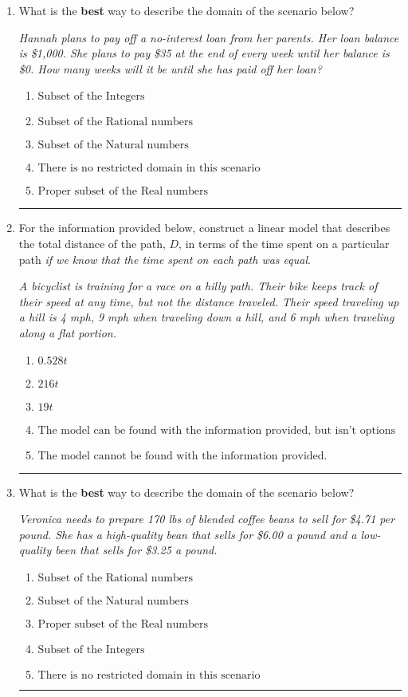\documentclass[14pt]{extbook}
\newcommand{\litem}[1]{\item#1\hspace*{-1cm}\rule{\textwidth}{0.4pt}}
\begin{document}
\begin{enumerate}
{\begin{enumerate}[label=\Alph*.]
\end{enumerate} }
\litem{
What is the \textbf{best} way to describe the domain of the scenario below?
\begin{center}
    \textit{ Hannah plans to pay off a no-interest loan from her parents. Her loan balance is \$1,000. She plans to pay \$35 at the end of every week until her balance is \$0. How many weeks will it be until she has paid off her loan? }
\end{center}
\begin{enumerate}[label=\Alph*.]
\item \( \text{Subset of the Integers} \)
\item \( \text{Subset of the Rational numbers} \)
\item \( \text{Subset of the Natural numbers} \)
\item \( \text{There is no restricted domain in this scenario} \)
\item \( \text{Proper subset of the Real numbers} \)

\end{enumerate} }
\litem{
For the information provided below, construct a linear model that describes the total distance of the path, $D$, in terms of the time spent on a particular path \textit{if we know that the time spent on each path was equal}.
\begin{center}
    \textit{ A bicyclist is training for a race on a hilly path. Their bike keeps track of their speed at any time, but not the distance traveled. Their speed traveling up a hill is 4 mph, 9 mph when traveling down a hill, and 6 mph when traveling along a flat portion. }
\end{center}
\begin{enumerate}[label=\Alph*.]
\item \( 0.528 t \)
\item \( 216 t \)
\item \( 19 t \)
\item \( \text{The model can be found with the information provided, but isn't options 1-3.} \)
\item \( \text{The model cannot be found with the information provided.} \)

\end{enumerate} }
\litem{
What is the \textbf{best} way to describe the domain of the scenario below?
\begin{center}
    \textit{ Veronica needs to prepare 170 lbs of blended coffee beans to sell for \$4.71 per pound. She has a high-quality bean that sells for \$6.00 a pound and a low-quality been that sells for \$3.25 a pound. }
\end{center}
\begin{enumerate}[label=\Alph*.]
\item \( \text{Subset of the Rational numbers} \)
\item \( \text{Subset of the Natural numbers} \)
\item \( \text{Proper subset of the Real numbers} \)
\item \( \text{Subset of the Integers} \)
\item \( \text{There is no restricted domain in this scenario} \)


\end{enumerate}}
\end{enumerate}
\end{document}
